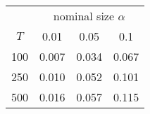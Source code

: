 % 
\begin{tabular}{cccc}
  \hline
  & \multicolumn{3}{c}{nominal size $\alpha$} \\
 $T$ & 0.01 & 0.05 & 0.1 \\
 \hline
100 & 0.007 & 0.034 & 0.067 \\ 
  250 & 0.010 & 0.052 & 0.101 \\ 
  500 & 0.016 & 0.057 & 0.115 \\ 
   \hline
\end{tabular}

